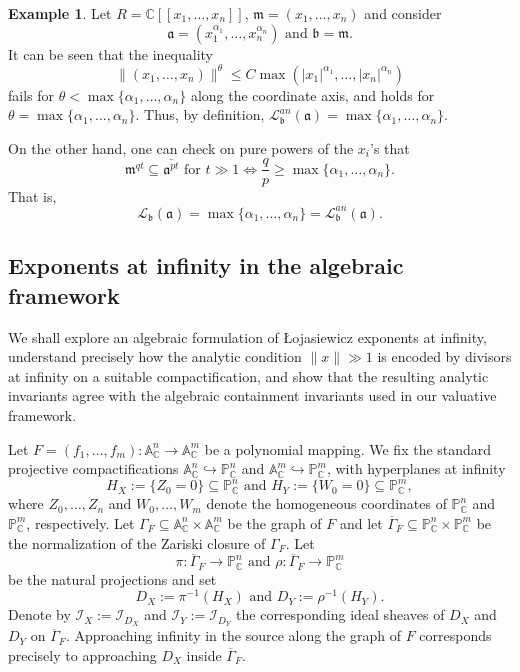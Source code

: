 \documentclass[12pt]{amsart}
\newcommand{\CC}{\mathbb{C}}
\newcommand{\PP}{\mathbb{P}}
\renewcommand{\AA}{\mathbb{A}}
\newcommand{\m}{\mathfrak m}
\renewcommand{\a}{\mathfrak{a}}
\renewcommand{\b}{\mathfrak{b}}
\newcommand{\cI}{\mathcal{I}}
\newcommand{\Loj}{\mathcal{L}} %
\theoremstyle{plain}
\theoremstyle{definition}
\newtheorem{example}[theorem]{Example}
\numberwithin{equation}{section}
\begin{document}
\begin{example} \label{ex.analytic=algebraic}
	Let $R = \CC[[x_1, \dots, x_n]]$, $\m = (x_1, \dots, x_n)$ and consider
	$$\a = (x_1^{\alpha_1}, \dots, x_n^{\alpha_n}) \text{ and } \b = \m.$$
	It can be seen that the inequality
	$$\|(x_1, \dots, x_n)\|^\theta \le C \max(|x_1|^{\alpha_1}, \dots, |x_n|^{\alpha_n})$$
	fails for $\theta < \max \{\alpha_1, \dots, \alpha_n\}$ along the coordinate axis, and holds for $\theta = \max\{\alpha_1, \dots, \alpha_n\}$. Thus, by definition,
	$\Loj^{an}_{\b}(\a) = \max\{\alpha_1, \dots, \alpha_n\}.$
	
	On the other hand, one can check on pure powers of the $x_i$'s that
	$$\m^{qt} \subseteq \overline{\a^{pt}} \text{ for } t \gg 1 \Longleftrightarrow \frac{q}{p} \ge \max\{\alpha_1, \dots, \alpha_n\}.$$
	That is,
	$$\Loj_{\b}(\a) = \max\{\alpha_1, \dots, \alpha_n\} = \Loj^{an}_{\b}(\a).$$
\end{example}

\subsection{Exponents at infinity in the algebraic framework}\label{subsec:algebraic-infinity}

We shall explore an algebraic formulation of \L{}ojasiewicz exponents at infinity, understand precisely how the analytic condition $\|x\|\gg 1$ is encoded by divisors at infinity on a suitable compactification, and  show that the resulting analytic invariants agree with the algebraic containment invariants used in our
valuative framework.

Let $F=(f_1,\dots,f_m):\AA^n_\CC\to\AA^m_\CC$ be a polynomial mapping.
We fix the standard projective compactifications
$\AA^n_\CC\hookrightarrow \PP^n_\CC$ and $\AA^m_\CC\hookrightarrow \PP^m_\CC$,
with hyperplanes at infinity
\[
H_X:=\{Z_0=0\}\subseteq \PP^n_\CC \text{ and } H_Y:=\{W_0=0\}\subseteq \PP^m_\CC,
\]
where $Z_0, \dots, Z_n$ and $W_0, \dots, W_m$ denote the homogeneous coordinates of $\PP^n_\CC$ and $\PP^m_\CC$, respectively.
Let $\Gamma_F\subseteq \AA^n_\CC\times\AA^m_\CC$ be the graph of $F$ and let
$\overline{\Gamma}_F\subseteq \PP^n_\CC\times\PP^m_\CC$ be the normalization of the
Zariski closure of $\Gamma_F$.
Let
\[
\pi:\overline{\Gamma}_F\to\PP^n_\CC \text{ and } \rho:\overline{\Gamma}_F\to\PP^m_\CC
\]
be the natural projections and set
\[
D_X:=\pi^{-1}(H_X) \text{ and } D_Y:=\rho^{-1}(H_Y).
\]
Denote by $\mathscr I_X:=\cI_{D_X}$ and $\mathscr I_Y:=\cI_{D_Y}$ the corresponding
ideal sheaves of $D_X$ and $D_Y$ on $\overline{\Gamma}_F$.
Approaching infinity in the source along the graph of $F$ corresponds precisely to
approaching $D_X$ inside $\overline{\Gamma}_F$.
\end{document}
